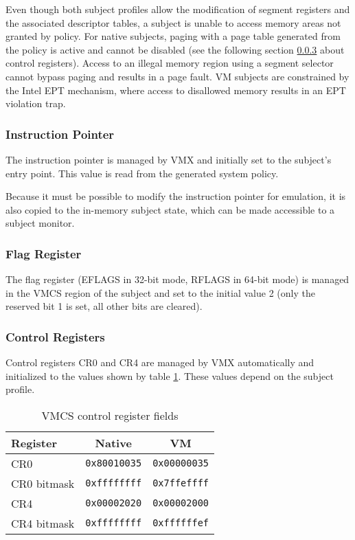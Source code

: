 Even though both subject profiles allow the modification of segment registers
and the associated descriptor tables, a subject is unable to access memory areas
not granted by policy. For native subjects, paging with a page table generated
from the policy is active and cannot be disabled (see the following section
\ref{subsubsec:control-regs} about control registers). Access to an illegal
memory region using a segment selector cannot bypass paging and results in a
page fault. VM subjects are constrained by the Intel EPT mechanism, where
access to disallowed memory results in an EPT violation trap.

\subsubsection{Instruction Pointer}
The instruction pointer is managed by VMX and initially set to the subject's
entry point. This value is read from the generated system policy.

Because it must be possible to modify the instruction pointer for emulation, it
is also copied to the in-memory subject state, which can be made accessible to a
subject monitor.

\subsubsection{Flag Register}
The flag register (EFLAGS in 32-bit mode, RFLAGS in 64-bit mode) is managed in
the VMCS region of the subject and set to the initial value 2 (only the reserved
bit 1 is set, all other bits are cleared).

\subsubsection{Control Registers}\label{subsubsec:control-regs}
Control registers CR0 and CR4 are managed by VMX automatically and initialized
to the values shown by table \ref{tab:vmcs-control-regs}. These values depend
on the subject profile.

\begin{table}[h]
	\centering
	\begin{tabular}{l|c|c}
		\textbf{Register} & \textbf{Native} & \textbf{VM} \\
		\hline
		CR0 & \texttt{0x80010035} & \texttt{0x00000035} \\
		CR0 bitmask & \texttt{0xffffffff} & \texttt{0x7ffeffff} \\
		CR4 & \texttt{0x00002020} & \texttt{0x00002000} \\
		CR4 bitmask & \texttt{0xffffffff} & \texttt{0xffffffef} \\
	\end{tabular}
	\caption{VMCS control register fields}
	\label{tab:vmcs-control-regs}
\end{table}

